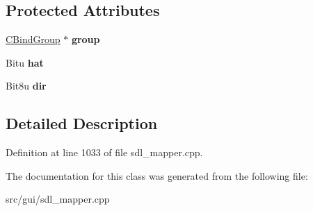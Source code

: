 \subsection*{Protected Attributes}
\begin{DoxyCompactItemize}
\item 
\hypertarget{classCJHatBind_a29b7138a9094d140fad3bb6bef01b3e2}{\hyperlink{classCBindGroup}{C\-Bind\-Group} $\ast$ {\bfseries group}}\label{classCJHatBind_a29b7138a9094d140fad3bb6bef01b3e2}

\item 
\hypertarget{classCJHatBind_a652e1ca02ee3c415917d41bd557a25ba}{Bitu {\bfseries hat}}\label{classCJHatBind_a652e1ca02ee3c415917d41bd557a25ba}

\item 
\hypertarget{classCJHatBind_a2b02bbb8de4fc7bb9941f535254dad19}{Bit8u {\bfseries dir}}\label{classCJHatBind_a2b02bbb8de4fc7bb9941f535254dad19}

\end{DoxyCompactItemize}


\subsection{Detailed Description}


Definition at line 1033 of file sdl\-\_\-mapper.\-cpp.



The documentation for this class was generated from the following file\-:\begin{DoxyCompactItemize}
\item 
src/gui/sdl\-\_\-mapper.\-cpp\end{DoxyCompactItemize}
